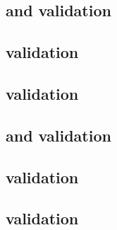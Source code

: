 \begin{sbmlenum}

\end{sbmlenum} \subsection*{ and  validation} \begin{sbmlenum}


\end{sbmlenum} \subsection*{ validation} \begin{sbmlenum}


\end{sbmlenum} \subsection*{ validation} \begin{sbmlenum}


\end{sbmlenum} \subsection*{ and  validation} \begin{sbmlenum}


\end{sbmlenum} \subsection*{ validation} \begin{sbmlenum}


\end{sbmlenum} \subsection*{ validation} \begin{sbmlenum}


\end{sbmlenum}
